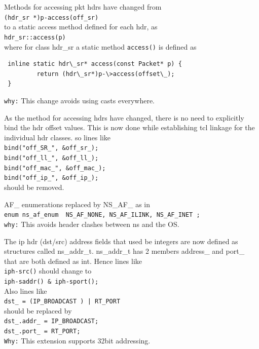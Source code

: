 \begin{flushleft}

Methods for accessing pkt hdrs have changed from \\
{\tt (hdr\_sr *)p-\>access(off\_sr) } \\
to a static access method defined for each hdr, as \\
{\tt hdr\_sr::access(p)} \\
where for class hdr\_sr a static method {\tt access()} is defined as
\begin{verbatim}
 inline static hdr\_sr* access(const Packet* p) {
		 return (hdr\_sr*)p-\>access(offset\_); 
 }
\end{verbatim}
{\tt why:} This change avoids using casts everywhere.


As the method for accessing hdrs have changed, there is no need to explicitly bind the hdr offset values. This is now done while establishing tcl linkage for the individual hdr classes.
so lines like \\
{\tt bind("off\_SR\_", \&off\_sr\_);}\\	
  {\tt bind("off\_ll\_", \&off\_ll\_);}\\
  {\tt bind("off\_mac\_", \&off\_mac\_);}\\
  {\tt bind("off\_ip\_", \&off\_ip\_); }\\
should be removed.

AF\_ enumerations replaced by NS\_AF\_ as in \\
{\tt enum ns\_af\_enum { NS\_AF\_NONE, NS\_AF\_ILINK, NS\_AF\_INET };}\\
{\tt why:} This avoids header clashes between ns and the OS.


The ip hdr (dst/src) address fields that used be integers are now defined as structures called ns\_addr\_t. ns\_addr\_t has 2 members address\_ and port\_ that are both defined as int. 
Hence lines like \\
{\tt iph-\>src()} should change to\\
{\tt iph-\>saddr() \& iph-\>sport();} \\
Also lines like \\
{\tt dst\_ = (IP\_BROADCAST \<) | RT\_PORT } \\
should be replaced by \\
{\tt  dst\_.addr\_ = IP\_BROADCAST;} \\
{\tt dst\_.port\_ = RT\_PORT;} \\
{\tt Why:} This extension supports 32bit addressing.



\end{flushleft}
